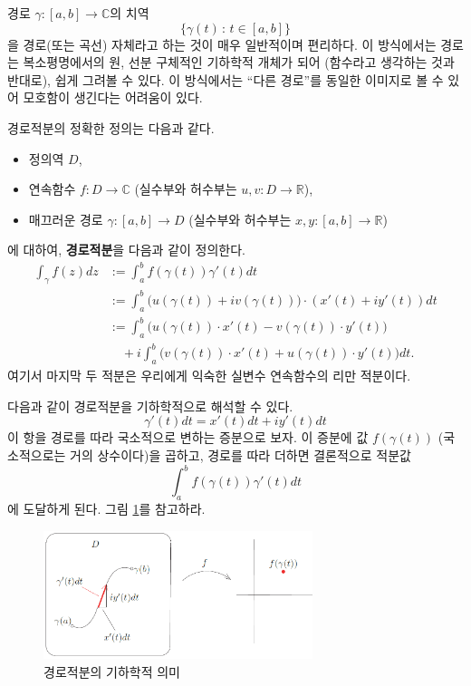\begin{salt_remark} \label{remark-3-1}
경로 $\gamma: [a,b]\to \mathbb C$의 치역
\[
\{\gamma(t) \,:\, t\in[a,b] \}
\]
을 경로(또는 곡선) 자체라고 하는 것이 매우 일반적이며 편리하다. 
이 방식에서는 경로는 
복소평명에서의 원, 선분 구체적인 기하학적 개체가 되어 (함수라고 생각하는 것과 반대로),
쉽게 그려볼 수 있다.
이 방식에서는 ``다른 경로''를 동일한 이미지로 볼 수 있어
모호함이 생긴다는 어려움이 있다.
\end{salt_remark}

경로적분의 정확한 정의는 다음과 같다.


\begin{saltdefinition} {}{} \label{def-3-1}
\begin{itemize}
\item[(1)] 정의역 $D$,
\item[(2)] 연속함수  $f:D\to\mathbb C$ (실수부와 허수부는 
$u,v: D\to\mathbb R$),
\item[(3)] 매끄러운 경로 $\gamma : [a,b]\to D$
(실수부와 허수부는 $x,y: [a,b] \to \mathbb R$)
\end{itemize}
에 대하여,
\textbf{경로적분}을 다음과 같이 정의한다.
\begin{align} \label{eq-3-2}
\int_\gamma f(z)dz
&:= \int_a^b f(\gamma(t))\gamma'(t)dt \\
&:= \int_a^b \big( u(\gamma(t)) + iv(\gamma(t)) \big) \cdot
(x'(t) + iy'(t))dt \nonumber \\
&:= \int_a^b \big( u(\gamma(t))\cdot x'(t) - v(\gamma(t))\cdot y'(t) \big) \nonumber \\
&\quad +i \int_a^b \big(v(\gamma(t))\cdot x'(t) + u(\gamma(t))\cdot y'(t) \big) dt \nonumber.
\end{align}
여기서 마지막 두 적분은 우리에게 익숙한 실변수 연속함수의 리만 적분이다.
\end{saltdefinition}

다음과 같이 경로적분을 기하학적으로 해석할 수 있다.
\[
\gamma'(t) dt = x'(t)dt + iy'(t)dt
\]
이 항을 경로를 따라 국소적으로 변하는 증분으로 보자.
이 증분에 값 $f(\gamma(t))$ (국소적으로는 거의 상수이다)을 곱하고,
경로를 따라 더하면 결론적으로 적분값
\[
\int_a^b f(\gamma(t))\gamma'(t)dt
\]
에 도달하게 된다. 그림 \ref{fig-3-4}를 참고하라.

\begin{figure}[!h]
\begin{center}
\includegraphics[width=0.7\textwidth]{./SaltChapter/figs/fig-3-4}
\end{center}
\caption{경로적분의 기하학적 의미}
\label{fig-3-4}
\end{figure}

